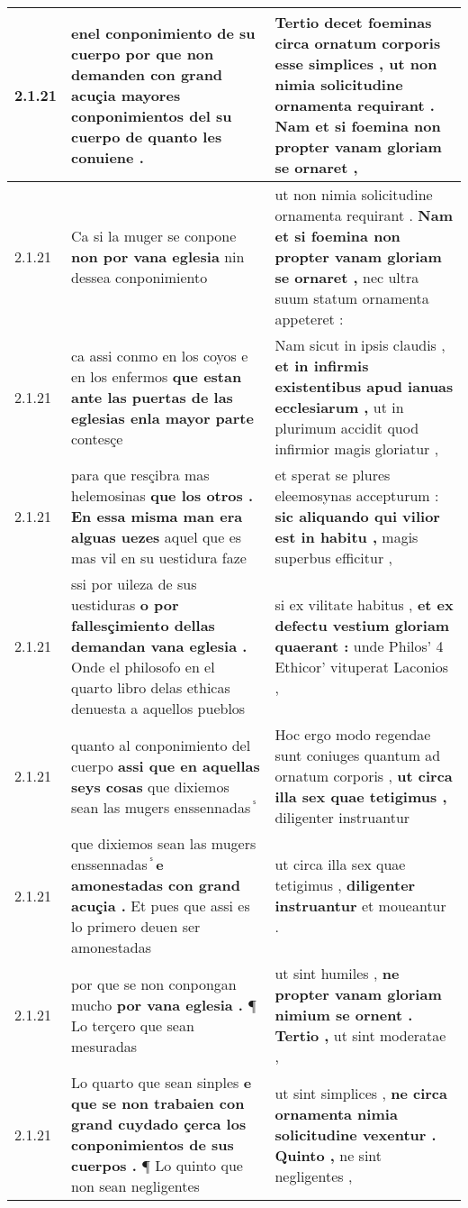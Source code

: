 \begin{tabular}{|p{1cm}|p{6.5cm}|p{6.5cm}|}
2.1.21 & enel conponimiento de su cuerpo \textbf{ por que non demanden con grand acuçia mayores conponimientos del su cuerpo } de quanto les conuiene . & Tertio decet foeminas circa ornatum corporis esse simplices , \textbf{ ut non nimia solicitudine ornamenta requirant . } Nam et si foemina non propter vanam gloriam se ornaret , \\\hline
2.1.21 & Ca si la muger se conpone \textbf{ non por vana eglesia } nin dessea conponimiento & ut non nimia solicitudine ornamenta requirant . \textbf{ Nam et si foemina non propter vanam gloriam se ornaret , } nec ultra suum statum ornamenta appeteret : \\\hline
2.1.21 & ca assi conmo en los coyos e en los enfermos \textbf{ que estan ante las puertas de las eglesias enla mayor parte } contesçe & Nam sicut in ipsis claudis , \textbf{ et in infirmis existentibus apud ianuas ecclesiarum , } ut in plurimum accidit quod infirmior magis gloriatur , \\\hline
2.1.21 & para que resçibra mas helemosinas \textbf{ que los otros . En essa misma man era alguas uezes } aquel que es mas vil en su uestidura faze & et sperat se plures eleemosynas accepturum : \textbf{ sic aliquando qui vilior est in habitu , } magis superbus efficitur , \\\hline
2.1.21 & ssi por uileza de sus uestiduras \textbf{ o por fallesçimiento dellas demandan vana eglesia . } Onde el philosofo en el quarto libro delas ethicas denuesta a aquellos pueblos & si ex vilitate habitus , \textbf{ et ex defectu vestium gloriam quaerant : } unde Philos’ 4 Ethicor’ vituperat Laconios , \\\hline
2.1.21 & quanto al conponimiento del cuerpo \textbf{ assi que en aquellas seys cosas } que dixiemos sean las mugers enssennadas ᷤ & Hoc ergo modo regendae sunt coniuges quantum ad ornatum corporis , \textbf{ ut circa illa sex quae tetigimus , } diligenter instruantur \\\hline
2.1.21 & que dixiemos sean las mugers enssennadas ᷤ \textbf{ e amonestadas con grand acuçia . } Et pues que assi es lo primero deuen ser amonestadas & ut circa illa sex quae tetigimus , \textbf{ diligenter instruantur } et moueantur . \\\hline
2.1.21 & por que se non conpongan mucho \textbf{ por vana eglesia . } ¶ Lo terçero que sean mesuradas & ut sint humiles , \textbf{ ne propter vanam gloriam nimium se ornent . Tertio , } ut sint moderatae , \\\hline
2.1.21 & Lo quarto que sean sinples \textbf{ e que se non trabaien con grand cuydado çerca los conponimientos de sus cuerpos . } ¶ Lo quinto que non sean negligentes & ut sint simplices , \textbf{ ne circa ornamenta nimia solicitudine vexentur . Quinto , } ne sint negligentes , \\\hline

\end{tabular}

